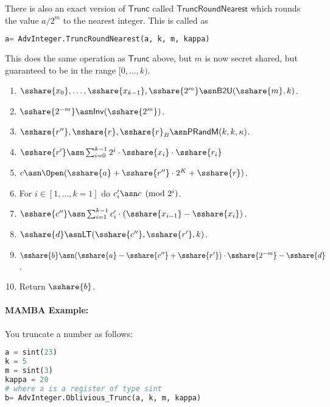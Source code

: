  There is also an exact version of $\mathsf{Trunc}$ called $\mathsf{TruncRoundNearest}$
  which rounds the value $a/2^m$ to the nearest integer.
  This is called as
  \begin{lstlisting}[language={python}]
a= AdvInteger.TruncRoundNearest(a, k, m, kappa)
\end{lstlisting}


  This does the same operation as $\mathsf{Trunc}$ above, but $m$ is now secret shared, but guaranteed to be in the range $[0,\ldots,k)$.
  \begin{enumerate}
    \item $\sshare{x_0},\ldots,\sshare{x_{k-1}}, \sshare{2^m} \asn \mathsf{B2U}(\sshare{m},k)$.
    \item $\sshare{2^{-m}} \asn \mathsf{Inv}(\sshare{2^m})$.
    \item $\sshare{r''}, \sshare{r}, \sshare{r}_B \asn \mathsf{PRandM}(k,k,\kappa)$.
    \item $\sshare{r'} \asn \sum_{i=0}^{k-1} 2^i \cdot \sshare{x_i} \cdot \sshare{r_i}$
    \item $c \asn \Open(\sshare{a}+\sshare{r''} \cdot 2^{K} +\sshare{r})$.
    \item For $i \in [1,\ldots,k=1]$ do $c_i' \asn c \pmod{2^i}$.
    \item $\sshare{c''} \asn \sum_{i=1}^{k-1} c_i' \cdot (\sshare{x_{i-1}}-\sshare{x_i})$.
    \item $\sshare{d} \asn \mathsf{LT}(\sshare{c''},\sshare{r'},k)$.
    \item $\sshare{b} \asn (\sshare{a}-\sshare{c''}+\sshare{r'}) \cdot \sshare{2^{-m}} - \sshare{d}$.
    \item Return $\sshare{b}$.
  \end{enumerate}

  \paragraph{MAMBA Example:} You truncate a number as follows:
  \begin{lstlisting}[language={python}]
a = sint(23)
k = 5
m = sint(3)
kappa = 20
# where a is a register of type sint
b= AdvInteger.Oblivious_Trunc(a, k, m, kappa)
\end{lstlisting}

